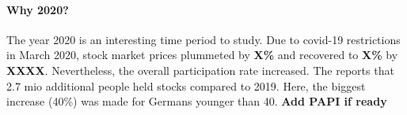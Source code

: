 \documentclass[ProjectABM]{subfiles}
\begin{document}




\paragraph{Why 2020?}
The year 2020 is an interesting time period to study. Due to covid-19 restrictions in March 2020, stock market prices plummeted by \textbf{X\%} and recovered to \textbf{X\%} by \textbf{XXXX}. Nevertheless, the overall participation rate increased. The \cite{DAI_2021} reports that 2.7 mio additional people held stocks compared to 2019. Here, the biggest increase (40\%) was made for Germans younger than 40. \textbf{Add PAPI if ready}
\end{document}
